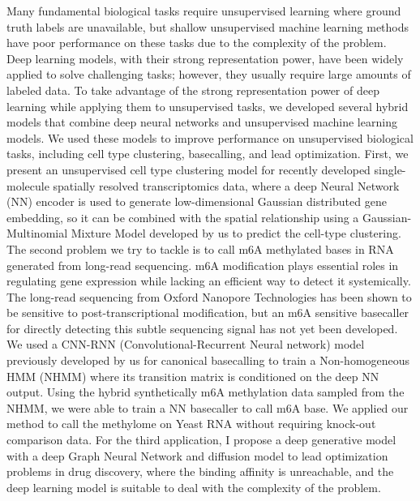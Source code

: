 Many fundamental biological tasks require unsupervised learning where ground truth labels are unavailable, but shallow unsupervised machine learning methods have poor performance on these tasks due to the complexity of the problem. Deep learning models, with their strong representation power, have been widely applied to solve challenging tasks; however, they usually require large amounts of labeled data. To take advantage of the strong representation power of deep learning while applying them to unsupervised tasks, we developed several hybrid models that combine deep neural networks and unsupervised machine learning models. We used these models to improve performance on unsupervised biological tasks, including cell type clustering, basecalling, and lead optimization.
First, we present an unsupervised cell type clustering model for recently developed  single-molecule spatially resolved transcriptomics data, where a deep Neural Network (NN) encoder is used to generate low-dimensional Gaussian distributed gene embedding, so it can be combined with the spatial relationship using a Gaussian-Multinomial Mixture Model developed by us to predict the cell-type clustering. The second problem we try to tackle is to call m6A methylated bases in RNA generated from long-read sequencing. m6A modification plays essential roles in regulating gene expression while lacking an efficient way to detect it systemically. The long-read sequencing from Oxford Nanopore Technologies has been shown to be sensitive to post-transcriptional modification, but an m6A sensitive basecaller for directly detecting this subtle sequencing signal has not yet been developed. We used a CNN-RNN (Convolutional-Recurrent Neural network) model previously developed by us for canonical basecalling to train a Non-homogeneous HMM (NHMM) where its transition matrix is conditioned on the deep NN output. Using the hybrid synthetically m6A methylation data sampled from the NHMM, we were able to train a NN basecaller to call m6A base. We applied our method to call the methylome on Yeast RNA without requiring knock-out comparison data. For the third application, I propose a deep generative model with a deep Graph Neural Network and diffusion model to lead optimization problems in drug discovery, where the binding affinity is unreachable, and the deep learning model is suitable to deal with the complexity of the problem.
